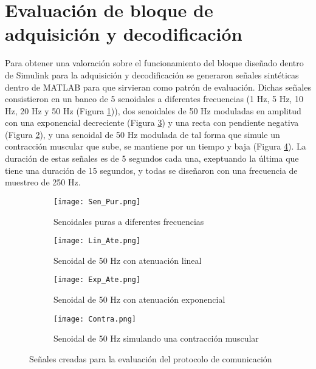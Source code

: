 \section{Evaluación de bloque de adquisición y decodificación}
Para obtener una valoración sobre el funcionamiento del bloque diseñado dentro de Simulink para la adquisición y decodificación se generaron señales sintéticas dentro de MATLAB para que sirvieran como patrón de evaluación. Dichas señales consistieron en un banco de 5 senoidales a diferentes frecuencias (1 Hz, 5 Hz, 10 Hz, 20 Hz y 50 Hz (Figura \ref{Figura: SenPur})), dos senoidales de 50 Hz moduladas en amplitud con una exponencial decreciente (Figura \ref{Figura: ExpAte}) y una recta con pendiente negativa (Figura \ref{Figura: LinAte}), y una senoidal de 50 Hz modulada de tal forma que simule un contracción muscular que sube, se mantiene por un tiempo y baja (Figura \ref{Figura: Contra}). La duración de estas señales es de 5 segundos cada una, exeptuando la última que tiene una duración de 15 segundos, y todas se diseñaron con una frecuencia de muestreo de 250 Hz.

\begin{figure}[htbp]
	\centering
	\begin{subfigure}[htbp]{0.4\textwidth}
		\texttt{[image: Sen\_Pur.png]}
		\caption{Senoidales puras a diferentes frecuencias}
		\label{Figura: SenPur}
	\end{subfigure}
	\hfill
	\begin{subfigure}[htbp]{0.4\textwidth}
		\texttt{[image: Lin\_Ate.png]}
		\caption{Senoidal de 50 Hz con atenuación lineal}
		\label{Figura: LinAte}
	\end{subfigure}
	\hfill
	\begin{subfigure}[htbp]{0.4\textwidth}
		\texttt{[image: Exp\_Ate.png]}
		\caption{Senoidal de 50 Hz con atenuación exponencial}
		\label{Figura: ExpAte}
	\end{subfigure}
	\hfill
	\begin{subfigure}[htbp]{0.4\textwidth}
		\texttt{[image: Contra.png]}
		\caption{Senoidal de 50 Hz simulando una contracción muscular}
		\label{Figura: Contra}
	\end{subfigure}	
	\caption{Señales creadas para la evaluación del protocolo de comunicación}
	\label{Figura: SenalesEva}
\end{figure}

